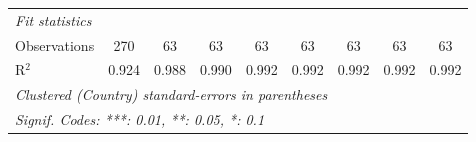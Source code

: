 \begin{table}[htbp]
\begin{tabular}{lcccccccc}
      \midrule \emph{Fit statistics}\\
      Observations                                                                    & 270     & 63      & 63             & 63             & 63             & 63             & 63             & 63\\  
      R$^2$                                                                           & 0.924   & 0.988   & 0.990          & 0.992          & 0.992          & 0.992          & 0.992          & 0.992\\  
      \midrule
      \multicolumn{9}{l}{\emph{Clustered (Country) standard-errors in parentheses}}\\
      \multicolumn{9}{l}{\emph{Signif. Codes: ***: 0.01, **: 0.05, *: 0.1}}\\
   \end{tabular}
\end{table}


